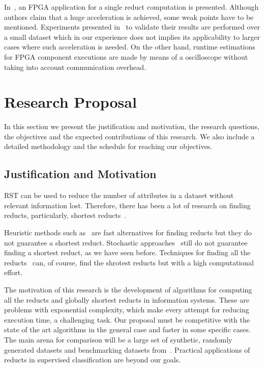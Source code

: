 \documentclass[authoryear,11pt]{elsarticle}
\begin{document}
  In~\citep{Grzes13,Kopczynski14}, an FPGA application for a single reduct computation is presented. Although
  authors claim that a huge acceleration is achieved, some weak points have to be mentioned. Experiments presented 
  in~\citep{Kopczynski14} to validate their results are performed over a small dataset which in our experience 
  does not implies its applicability to larger cases where such acceleration is needed. On the other hand, 
  runtime estimations for FPGA component executions are made by means of a oscilloscope without taking into 
  account communication overhead.
\clearpage
\section{Research Proposal}\label{ResearchProposal} 
 In this section we present the justification and motivation, the research questions, the objectives and the
 expected contributions of this research. We also include a detailed methodology and the schedule for reaching
 our objectives.

\subsection{Justification and Motivation}\label{Justification}
  RST can be used to reduce the number of attributes in a dataset without relevant information lost. 
  Therefore, there has been a lot of research on finding reducts, particularly, shortest 
  reducts~\citep{Jensen14}. %
  
  Heuristic methods such as~\citep{Chouchoulas01,Jensen04,Zhong01} are fast alternatives for finding 
  reducts but they do not guarantee a shortest reduct. Stochastic approaches~\citep{Wroblewski95,Jensen03,
  Chen10,Wang07} still do not guarantee finding a shortest reduct, as we have seen before. Techniques 
  for finding all the reducts~\citep{Starzyk99,WangP07} can, of course, find the
  shrotest reducts but with a high computational effort.
  
  The motivation of this research is the development of algorithms for computing all the reducts and 
  globally shortest reducts in information systems. These are problems with exponential complexity, which 
  make every attempt for reducing execution time, a challenging task.
  Our proposal must be competitive with the state of 
  the art algorithms in the general case and faster in some specific cases. The main arena for comparison 
  will be a large set of synthetic, randomly generated datasets and benchmarking datasets from~\citep{Bache13}. 
  Practical applications of reducts in supervised classification are beyond our goals.
  
\end{document}

